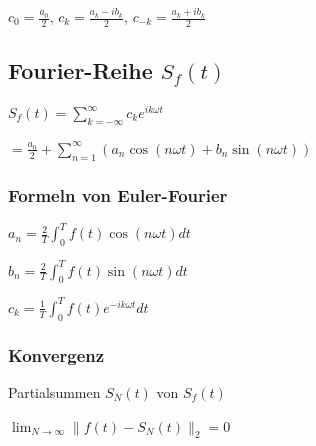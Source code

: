 $c_0=\frac{a_0}{2}$, $c_k = \frac{a_k - ib_k}{2}$, $c_{-k}=\frac{a_k+ib_k}{2}$

\subsection*{Fourier-Reihe $S_f(t)$}
$S_f(t) = \sum_{k=-\infty}^\infty c_k e^{ik\omega t}$

$= \frac{a_0}{2} + \sum_{n=1}^\infty (a_n\cos(n\omega t)+b_n\sin(n\omega t))$

\subsubsection*{Formeln von Euler-Fourier}
$a_n = \frac{2}{T} \int_0^T f(t)\cos(n\omega t)dt$

$b_n = \frac{2}{T} \int_0^T f(t)\sin(n\omega t)dt$

$c_k = \frac{1}{T} \int_0^T f(t) e^{-ik\omega t}dt$

\subsubsection*{Konvergenz}
Partialsummen $S_N(t)$ von $S_f(t)$

$\lim_{N\to\infty}\|f(t)-S_N(t)\|_2 = 0$
